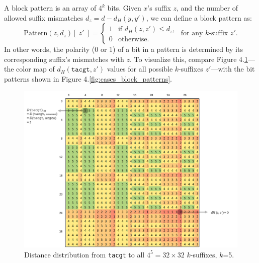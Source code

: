 \documentclass[oneside,12pt]{DISCSthesis}
\begin{document}
{		\noindent A block pattern is an array of $4^k$ bits. Given $x$'s suffix $z$, and the number of allowed suffix mismatches $d_z = d - d_H(y,y')$, we can define a block pattern as:
		\begin{equation}
			\text{Pattern}(z,d_z) [\ z'\ ] = \left\{
			\begin{array}{rl}
				1 & \text{if } d_H(z,z') \leq d_z,\\
				0 & \text{otherwise.}
			\end{array} \right.
			\text{ for any $k$-suffix }z'.
			\end{equation}
		\noindent In other words, the polarity (0 or 1) of a bit in a pattern is determined by its corresponding suffix's mismatches with $z$. To visualize this, compare Figure 4.\ref{fig:D_tacgt}---the color map of $d_H(\texttt{tacgt},z')$ values for all possible $k$-suffixes $z'$---with the bit patterns shown in Figure 4.\ref{fig:cases_block_patterns}.
		\begin{figure}[h] \label{fig:D_tacgt}
			\centering
			\includegraphics[width=5.5in]{img/D(tacgt)_marked_2}
			\caption{Distance distribution from \texttt{tacgt} to all $4^{5} = 32 \times 32$ $k$-suffixes, $k$=5.}
			\end{figure}


}
\end{document}
